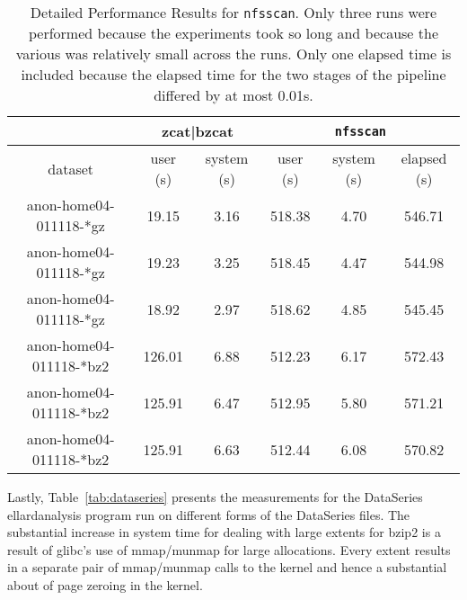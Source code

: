 \documentclass{article}
\begin{document}
\begin{table}
\begin{tabular}{|c|c|c|c|c|c|} \hline
& \multicolumn{2}{c|}{zcat|bzcat} & \multicolumn{3}{c|}{\texttt{nfsscan}} \\ \hline
 dataset & user (s) & system (s) & user (s)& system (s)& elapsed (s)\\ \hline

anon-home04-011118-*gz  & 19.15  & 3.16 & 518.38 & 4.70 & 546.71 \\
anon-home04-011118-*gz  & 19.23  & 3.25 & 518.45 & 4.47 & 544.98 \\
anon-home04-011118-*gz  & 18.92  & 2.97 & 518.62 & 4.85 & 545.45 \\

anon-home04-011118-*bz2 & 126.01 & 6.88 & 512.23 & 6.17 & 572.43 \\
anon-home04-011118-*bz2 & 125.91 & 6.47 & 512.95 & 5.80 & 571.21 \\
anon-home04-011118-*bz2 & 125.91 & 6.63 & 512.44 & 6.08 & 570.82 \\ \hline
\end{tabular}
\label{tab:nfsscan}

\caption{Detailed Performance Results for \texttt{nfsscan}.  Only
three runs were performed because the experiments took so long and
because the various was relatively small across the runs.  Only one
elapsed time is included because the elapsed time for the two stages
of the pipeline differed by at most 0.01s.}

\end{table}

Lastly, Table~\ref{tab:dataseries} presents the measurements for the
DataSeries ellardanalysis program run on different forms of the
DataSeries files.  The substantial increase in system time for dealing
with large extents for bzip2 is a result of glibc's use of mmap/munmap
for large allocations.  Every extent results in a separate pair of
mmap/munmap calls to the kernel and hence a substantial about of page
zeroing in the kernel.
\end{document}
